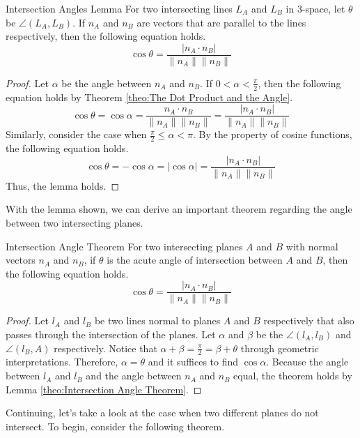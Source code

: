 \documentclass[../../../main.tex]{subfiles}
\begin{document}
\begin{lemma}{}{Intersection Angles Lemma}
For two intersecting lines $L_A$ and $L_B$ in 3-space, let $\theta$
be $\angle(L_A, L_B)$. If $n_A$ and $n_B$ are vectors that are
parallel to the lines respectively, then the following equation holds.
\[
\cos\theta
= \frac{| n_A \cdot n_B |}{\| n_A \| \| n_B \|}
\]
\end{lemma}
\begin{proof}
Let $\alpha$ be the angle between $n_A$ and $n_B$. If $0 < \alpha <
\frac{\pi}{2}$, then the following equation holds by Theorem
\ref{theo:The Dot Product and the Angle}.
\[
\cos\theta
= \cos\alpha
= \frac{n_A \cdot n_B}{\| n_A \| \| n_B \|}
= \frac{| n_A \cdot n_B |}{\| n_A \| \| n_B \|}
\]
Similarly, consider the case when $\frac{\pi}{2} \leq \alpha < \pi$.
By the property of cosine functions, the following equation holds.
\[
\cos\theta
= -\cos\alpha
= |\cos\alpha|
= \frac{| n_A \cdot n_B |}{\| n_A \| \| n_B \|}
\]
Thus, the lemma holds.
\end{proof}

With the lemma shown, we can derive an important theorem regarding
the angle between two intersecting planes.

\begin{theorem}{}{Intersection Angle Theorem}
For two intersecting planes $A$ and $B$ with normal vectors
$n_A$ and $n_B$, if $\theta$ is the acute angle of intersection
between $A$ and $B$, then the following equation holds.
\[
\cos\theta
= \frac{| n_A \cdot n_B |}{\| n_A \| \| n_B \|}
\]
\end{theorem}
\begin{proof}
Let $l_A$ and $l_B$ be two lines normal to planes $A$ and $B$
respectively that also passes through the intersection of the planes.
Let $\alpha$ and $\beta$ be the $\angle(l_A, l_B)$ and
$\angle(l_B, A)$ respectively. Notice that $\alpha + \beta =
\frac{\pi}{2} = \beta + \theta $ through geometric interpretations.
Therefore, $\alpha = \theta$ and it suffices to find $\cos\alpha$.
Because the angle between $l_A$ and $l_B$ and the angle between
$n_A$ and $n_B$ equal, the theorem holds by Lemma
\ref{theo:Intersection Angle Theorem}.
\end{proof}

Continuing, let's take a look at the case when two different planes
do not intersect. To begin, consider the following theorem.
\end{document}
